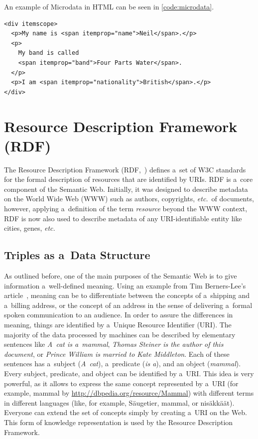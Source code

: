 An example of Microdata in HTML can be seen in \autoref{code:microdata}.

\begin{lstlisting}[caption={
  [Sample code snippet with Microdata mark-up]
  {Sample code snippet with Microdata mark-up
   (\url{http://www.w3.org/TR/microdata/})}},
  label={code:microdata}]
<div itemscope>
  <p>My name is <span itemprop="name">Neil</span>.</p>
  <p>
    My band is called
    <span itemprop="band">Four Parts Water</span>.
  </p>
  <p>I am <span itemprop="nationality">British</span>.</p>
</div>
\end{lstlisting}

\section{Resource Description Framework (RDF)} \label{sec:rdf}

The Resource Description Framework (RDF,~\cite{klyne2004rdf})
defines a~set of W3C standards for the formal description of
resources that are identified by URIs.
RDF is a~core component of the Semantic Web.
Initially, it was designed to describe metadata
on the World Wide Web (WWW) such as authors,
copyrights, \emph{etc.}\ of documents, however,
applying a~definition of the term \emph{resource}
beyond the WWW context,
RDF is now also used to describe metadata
of any URI-identifiable entity like cities, genes, \emph{etc.}

\subsection{Triples as a~Data Structure}

As outlined before, one of the main purposes of the Semantic Web
is to give information a~well-defined meaning.
Using an example from Tim Berners-Lee’s
article~\cite{bernerslee2001semanticweb},
meaning can be to differentiate between the concepts of
a~shipping and a~billing address,
or the concept of an address in the sense of
delivering a~formal spoken communication to an audience.
In order to assure the differences in meaning,
things are identified by a~Unique Resource Identifier (URI).
The majority of the data processed by machines
can be described by elementary sentences like
\emph{A~cat is a~mammal},
\emph{Thomas Steiner is the author of this document},
or \emph{Prince William is married to Kate Middleton}.
Each of these sentences has a~subject (\emph{A~cat}),
a~predicate (\emph{is a}), and an object (\emph{mammal}).
Every subject, predicate, and object can be identified by a~URI.
This idea is very powerful,
as it allows to express the same concept
represented by a~URI (for example, mammal by
\url{http://dbpedia.org/resource/Mammal})
with different terms in different languages
(like, for example, Säugetier, mammal, or nisäkkäät).
Everyone can extend the set of concepts
simply by creating a~URI on the Web.
This form of knowledge representation
is used by the Resource Description Framework.


